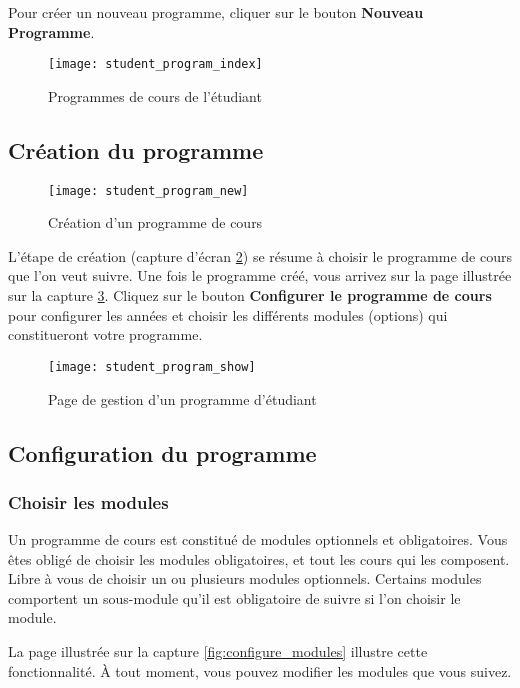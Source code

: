 Pour créer un nouveau programme, cliquer sur le bouton \textbf{Nouveau Programme}.


\begin{figure}[htb]
\centering
\caption{Programmes de cours de l'étudiant}
\label{fig:student_program_index}
\texttt{[image: student\_program\_index]}
\end{figure}

\subsection{Création du programme}

\begin{figure}[htb]
\centering
\caption{Création d'un programme de cours}
\label{fig:student_program_new}
\texttt{[image: student\_program\_new]}
\end{figure}

L'étape de création (capture d'écran \ref{fig:student_program_new}) se résume à choisir le programme de cours que l'on veut suivre. Une fois le programme créé, vous arrivez sur la page illustrée sur la capture \ref{fig:student_program_mgmt}. Cliquez sur le bouton \textbf{Configurer le programme de cours} pour configurer les années et choisir les différents modules (options) qui constitueront votre programme.

\begin{figure}[htb]
\centering
\caption{Page de gestion d'un programme d'étudiant}
\label{fig:student_program_mgmt}
\texttt{[image: student\_program\_show]}
\end{figure}

\subsection{Configuration du programme}
\subsubsection{Choisir les modules}
Un programme de cours est constitué de modules optionnels et obligatoires. Vous êtes obligé de choisir les modules obligatoires, et tout les cours qui les composent. Libre à vous de choisir un ou plusieurs modules optionnels. Certains modules comportent un sous-module qu'il est obligatoire de suivre si l'on choisir le module.

La page illustrée sur la capture \ref{fig:configure_modules} illustre cette fonctionnalité. À tout moment, vous pouvez modifier les modules que vous suivez. 

